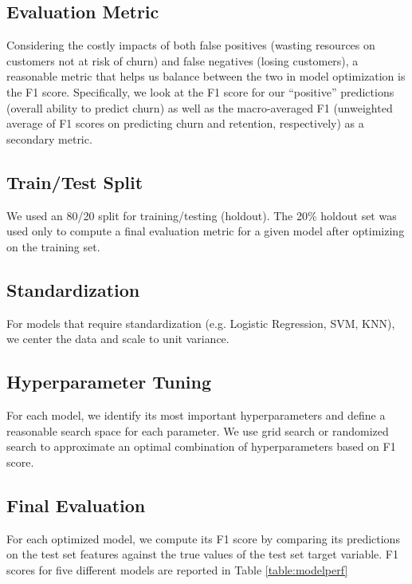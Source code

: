 \documentclass[twoside,twocolumn]{article}
\begin{document}
\noindent\subsection{Evaluation Metric} Considering the costly impacts of both false positives (wasting resources on customers not at risk of churn) and false negatives (losing customers), a reasonable metric that helps us balance between the two in model optimization is the F1 score. Specifically, we look at the F1 score for our “positive” predictions (overall ability to predict churn) as well as the macro-averaged F1 (unweighted average of F1 scores on predicting churn and retention, respectively) as a secondary metric.

\noindent\subsection{Train/Test Split} We used an 80/20 split for training/testing (holdout). The 20\% holdout set was used only to compute a final evaluation metric for a given model after optimizing on the training set.

\noindent\subsection{Standardization} For models that require standardization (e.g. Logistic Regression, SVM, KNN), we center the data and scale to unit variance.

\noindent \subsection{Hyperparameter Tuning} For each model, we identify its most important hyperparameters and define a reasonable search space for each parameter. We use grid search or randomized search to approximate an optimal combination of hyperparameters based on F1 score.

\noindent \subsection{Final Evaluation} For each optimized model, we compute its F1 score by comparing its predictions on the test set features against the true values of the test set target variable. F1 scores for five different models are reported in Table \ref{table:modelperf}
\end{document}
